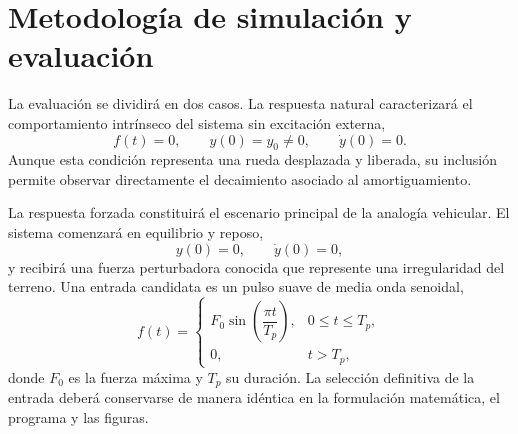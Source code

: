 \section{Metodología de simulación y evaluación}

La evaluación se dividirá en dos casos. La respuesta natural caracterizará el comportamiento intrínseco del sistema sin excitación externa,
\begin{equation}
  f(t)=0, \qquad y(0)=y_0\neq0, \qquad \dot y(0)=0.
\end{equation}
Aunque esta condición representa una rueda desplazada y liberada, su inclusión permite observar directamente el decaimiento asociado al amortiguamiento.

La respuesta forzada constituirá el escenario principal de la analogía vehicular. El sistema comenzará en equilibrio y reposo,
\begin{equation}
  y(0)=0, \qquad \dot y(0)=0,
\end{equation}
y recibirá una fuerza perturbadora conocida que represente una irregularidad del terreno. Una entrada candidata es un pulso suave de media onda senoidal,
\begin{equation}
  f(t)=
  \begin{cases}
    F_0\sin\left(\dfrac{\pi t}{T_p}\right), & 0\leq t\leq T_p,\\[5pt]
    0, & t>T_p,
  \end{cases}
  \label{eq:pulso}
\end{equation}
donde $F_0$ es la fuerza máxima y $T_p$ su duración. La selección definitiva de la entrada deberá conservarse de manera idéntica en la formulación matemática, el programa y las figuras.


